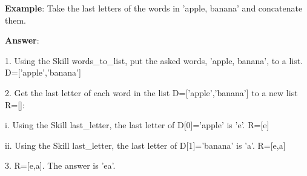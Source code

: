 \documentclass{article} \usepackage{arxiv}
\begin{document}
\newpage

\begin{tcolorbox}[title = {An Example of Skill Composition for Last Letter Concatenation}, colback = Apricot!25!white, colframe = BrickRed!75!black] 
\textbf{Example}: Take the last letters of the words in 'apple, banana' and concatenate them.

\quad

\textbf{Answer}:

1. Using the Skill words\_to\_list, put the asked words, 'apple, banana', to a list. D=['apple','banana'] 

\quad 


2. Get the last letter of each word in the list D=['apple','banana'] to a new list R=[]: 

\quad 
      \qquad i. Using the Skill last\_letter, the last letter of D[0]='apple' is 'e'. R=[e] 
      
     \qquad ii. Using the Skill last\_letter, the last letter of D[1]='banana' is 'a'. R=[e,a] 

\quad 

3. R=[e,a]. The answer is 'ea'.   
\end{tcolorbox}
\noindent\begin{minipage}{\textwidth}
 \label{Tab:compose_last_letter_skill}
\end{minipage}


\newpage
\end{document}
